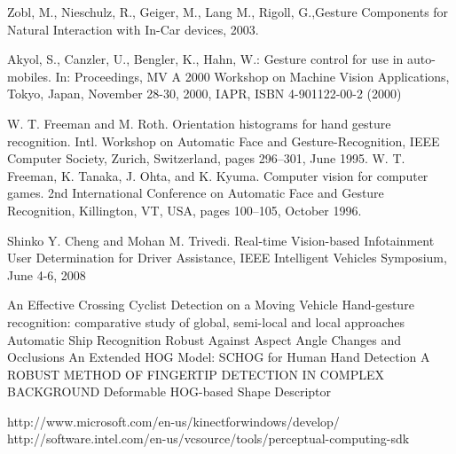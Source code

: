 \documentclass[a4paper,11pt,oneside]{book}
\begin{document}
\begin{thebibliography}{2}

 Zobl, M., Nieschulz, R., Geiger, M., Lang M., Rigoll, G.,{Gesture Components for Natural Interaction with In-Car devices}, 2003.

 Akyol, S., Canzler, U., Bengler, K., Hahn, W.: Gesture control for use in auto-mobiles. In: Proceedings, MV A 2000 Workshop on Machine Vision Applications, Tokyo, Japan, November 28-30, 2000, IAPR, ISBN 4-901122-00-2 (2000)

 W. T. Freeman and M. Roth. Orientation histograms for hand gesture recognition. Intl. Workshop on Automatic Face and Gesture-Recognition, IEEE Computer Society, Zurich, Switzerland, pages 296–301, June 1995.
 W. T. Freeman, K. Tanaka, J. Ohta, and K. Kyuma. Computer vision for computer games. 2nd International Conference on Automatic Face and Gesture Recognition, Killington, VT, USA, pages 100–105, October 1996.

 Shinko Y. Cheng and Mohan M. Trivedi. Real-time Vision-based Infotainment User Determination for Driver Assistance, IEEE Intelligent Vehicles Symposium, June 4-6, 2008

 An Effective Crossing Cyclist Detection on a Moving Vehicle
 Hand-gesture recognition: comparative study of global, semi-local and local approaches
 Automatic Ship Recognition Robust Against Aspect Angle Changes and Occlusions
 An Extended HOG Model: SCHOG for Human Hand Detection
 A ROBUST METHOD OF FINGERTIP DETECTION IN COMPLEX BACKGROUND
 Deformable HOG-based Shape Descriptor

 http://www.microsoft.com/en-us/kinectforwindows/develop/
 http://software.intel.com/en-us/vcsource/tools/perceptual-computing-sdk

\end{thebibliography}
\end{document}
